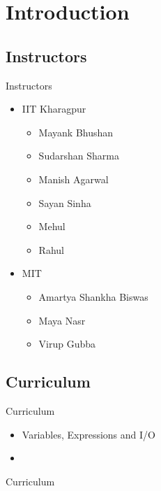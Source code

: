 \section{Introduction}

\subsection{Instructors}
\begin{frame}{Instructors}{}
\begin{itemize}
	\item IIT Kharagpur
	\begin{itemize}
		\item Mayank Bhushan
		\item Sudarshan Sharma
		\item Manish Agarwal
		\item Sayan Sinha
		\item Mehul
		\item Rahul
	\end{itemize}
	\item MIT
	\begin{itemize}
		\item Amartya Shankha Biswas
		\item Maya Nasr
		\item Virup Gubba
	\end{itemize}
\end{itemize}
\end{frame}

\subsection{Curriculum}
\begin{frame}{Curriculum}{}
\begin{itemize}
	\item Variables, Expressions and I/O
	\item 
\end{itemize}
\end{frame}

\begin{frame}{Curriculum}{}
\end{frame}
